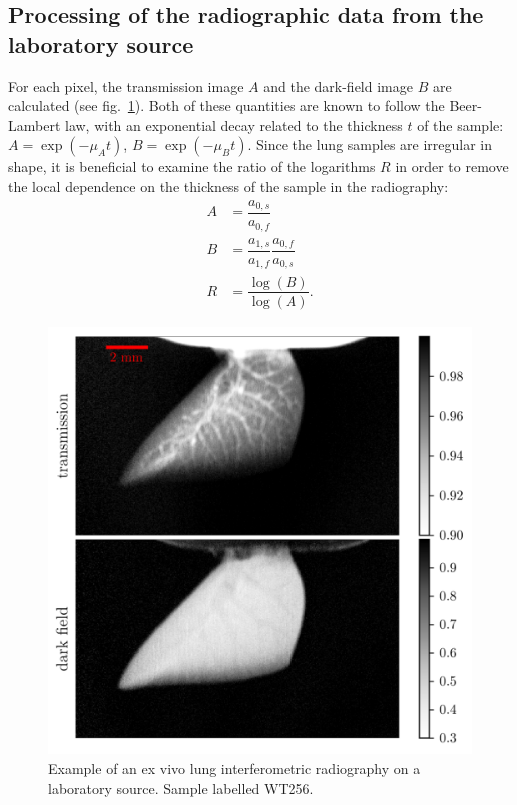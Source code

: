 \subsection{Processing of the radiographic data from the laboratory source}\label{sec:radioprocessing}
For each pixel, the transmission image $A$ and the
dark-field image $B$ are calculated (see fig.~\ref{590406}). Both of these
quantities are known to follow the Beer-Lambert law, with an exponential
decay related to the thickness $t$ of the sample: $A = \exp(-\mu_A t)$, $B =
\exp(-\mu_B t)$. Since the lung samples are irregular in shape, it is
beneficial to examine the ratio of the logarithms $R$ in
order to remove the local dependence on the thickness of the sample in the
radiography:
\begin{align}
    A &= \dfrac{a_{0,s}}{a_{0,f}}\\
    B &= \dfrac{a_{1,s}}{a_{1,f}}\dfrac{a_{0,f}}{a_{0,s}}\\
    R &= \dfrac{\log(B)}{\log(A)}.
    \label{eqn:definitions}
\end{align}
\begin{figure}[h!]
    \centering
    \includegraphics[width=\columnwidth]{gfx/lung-paper-figures/KO373_LL_smoke/WT256_LL_smoke}
    \caption[Radiography of a mouse lung on a laboratory source]{Example of an ex vivo lung interferometric radiography on a laboratory
        source. Sample labelled WT256.
        {\label{590406}}}
\end{figure}


